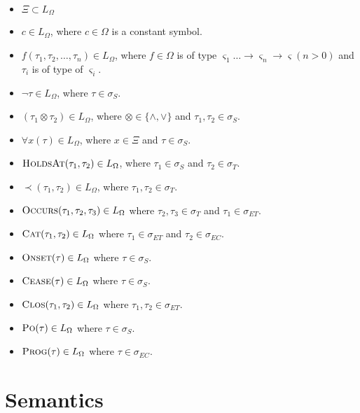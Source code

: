 \begin{itemize}
	\item $\Xi \subset L_{\Omega}$
	\item $c \in L_{\Omega}$, where $c \in \Omega$ is a constant symbol.
	\item $f(\tau_1, \tau_2, \dots, \tau_n) \in L_{\Omega}$, where $f \in \Omega$ is of type
	      $\varsigma_1 \dots \to \varsigma_n \to \varsigma  (n > 0)$ and $\tau_i$ is of type of $\varsigma_i$.
	\item $\neg \tau \in L_{\Omega}$, where $\tau \in \sigma_S$.
	\item $(\tau_1 \otimes \tau_2) \in L_{\Omega}$, where $\otimes \in \{\land, \lor\}$ and $\tau_1, \tau_2 \in \sigma_S$.
	\item $\forall x(\tau) \in L_{\Omega}$, where $x \in \Xi$ and $\tau \in \sigma_S$.
	\item $\textsc{HoldsAt}(\tau_1, \tau_2) \in L_{\Omega}$, where $\tau_1 \in \sigma_S$ and $\tau_2 \in \sigma_T$.
	\item $\prec(\tau_1, \tau_2) \in L_{\Omega}$, where $\tau_1, \tau_2 \in \sigma_T$.
	\item $\textsc{Occurs}(\tau_1, \tau_2, \tau_3) \in L_{\Omega}$ where $\tau_2, \tau_3 \in \sigma_T$  and $\tau_1 \in \sigma_{ET}$.
	\item $\textsc{Cat}(\tau_1, \tau_2) \in L_{\Omega}$ where $\tau_1 \in \sigma_{ET}$ and $\tau_2 \in \sigma_{EC}$.
	\item $\textsc{Onset}(\tau) \in L_{\Omega}$ where $\tau \in \sigma_S$.
	\item $\textsc{Cease}(\tau) \in L_{\Omega}$ where $\tau \in \sigma_S$.
	\item $\textsc{Clos}(\tau_1, \tau_2) \in L_{\Omega}$ where $\tau_1, \tau_2 \in \sigma_{ET}$.
	\item $\textsc{Po}(\tau) \in L_{\Omega}$ where $\tau \in \sigma_S$.
	\item $\textsc{Prog}(\tau) \in L_{\Omega}$ where $\tau \in \sigma_{EC}$.
\end{itemize}


\section{Semantics}

